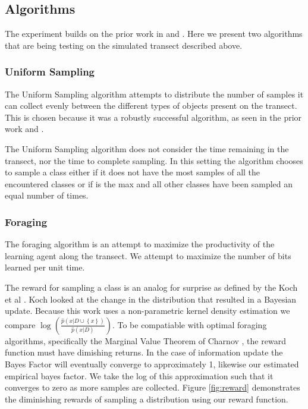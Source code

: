 \subsection{Algorithms}


The experiment builds on the prior work in \cite{furlong2014sequential} and \cite{furlong2014budgeting}.  Here we present two algorithms that are being testing on the simulated transect described above.

\subsubsection{Uniform Sampling}

The Uniform Sampling algorithm attempts to distribute the number of samples it
can collect evenly between the different types of objects present on the
transect.  This is chosen because it was a robustly successful algorithm, as
seen in the prior work \cite{furlong2014sequential} and \cite{furlong2014budgeting}.

The Uniform Sampling algorithm does not consider the time remaining in the
transect, nor the time to complete sampling.  In this setting the algorithm
chooses to sample a class either if it does not have the most samples of all
the encountered classes or if is the max and all other classes have been
sampled an equal number of times.

\subsubsection{Foraging}

The foraging algorithm is an attempt to maximize the productivity of the learning agent along the transect.  We attempt to maximize the number of bits learned per unit time.

The reward for sampling a class is an analog for surprise as
defined by the Koch et al \cite{itti2009bayesian}.  Koch looked at the change
in the distribution that resulted in a Bayesian update.  Because this work
uses a non-parametric kernel density estimation we compare
$\log\left(\frac{\hat{p}(x|D\cup \left\{x\right\})}{\hat{p}(x|D)}\right)$.  To
be compatiable with optimal foraging algorithms, specifically the Marginal
Value Theorem of Charnov \cite{charnov1973optimal}, the reward function must
have dimishing returns.  In the case of information update the Bayes Factor
will eventually converge to approximately 1, likewise our estimated empirical
bayes factor.  We take the log of this approximation such that it converges to
zero as more samples are collected.  Figure \ref{fig:reward} demonstrates the diminishing rewards of sampling a distribution using our reward function.


